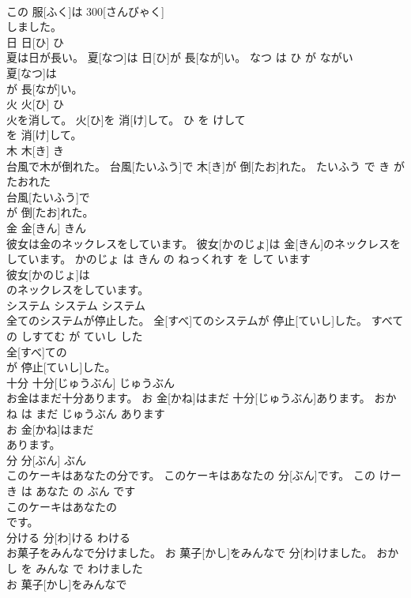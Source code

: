 \documentclass[8pt]{extreport}
\begin{document}
\begin{CJK}{UTF8}{min}
\\	この 服[ふく]は 300[さんびゃく]
\\	しました。			
\\	日	日[ひ]	ひ	
\\	夏は日が長い。	夏[なつ]は 日[ひ]が 長[なが]い。	なつ は ひ が ながい	
\\	夏[なつ]は
\\	が 長[なが]い。			
\\	火	火[ひ]	ひ	
\\	火を消して。	火[ひ]を 消[け]して。	ひ を けして	
\\	を 消[け]して。			
\\	木	木[き]	き	
\\	台風で木が倒れた。	台風[たいふう]で 木[き]が 倒[たお]れた。	たいふう で き が たおれた	
\\	台風[たいふう]で
\\	が 倒[たお]れた。			
\\	金	金[きん]	きん	
\\	彼女は金のネックレスをしています。	彼女[かのじょ]は 金[きん]のネックレスをしています。	かのじょ は きん の ねっくれす を して います	
\\	彼女[かのじょ]は
\\	のネックレスをしています。			
\\	システム	システム	システム	
\\	全てのシステムが停止した。	全[すべ]てのシステムが 停止[ていし]した。	すべて の しすてむ が ていし した	
\\	全[すべ]ての
\\	が 停止[ていし]した。			
\\	十分	十分[じゅうぶん]	じゅうぶん	
\\	お金はまだ十分あります。	お 金[かね]はまだ 十分[じゅうぶん]あります。	おかね は まだ じゅうぶん あります	
\\	お 金[かね]はまだ
\\	あります。			
\\	分	分[ぶん]	ぶん	
\\	このケーキはあなたの分です。	このケーキはあなたの 分[ぶん]です。	この けーき は あなた の ぶん です	
\\	このケーキはあなたの
\\	です。			
\\	分ける	分[わ]ける	わける	
\\	お菓子をみんなで分けました。	お 菓子[かし]をみんなで 分[わ]けました。	おかし を みんな で わけました	
\\	お 菓子[かし]をみんなで

\end{CJK}
\end{document}

